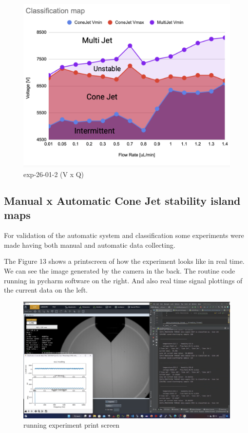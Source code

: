     \begin{figure}[H]
        \center
        \includegraphics[width=12cm]{Figuras/regions.png}
        \caption{ exp-26-01-2 (V x Q)}
    \end{figure}



    \subsection{Manual x Automatic Cone Jet stability island maps}

        For validation of the automatic system and classification some experiments were made having both manual and automatic data collecting.

        The Figure 13 shows a printscreen of how the experiment looks like in real time.
        We can see the image generated by the camera in the back.
        The routine code running in pycharm software on the right.
        And also real time signal plottings of the current data on the left.

        \begin{figure}[H]
            \center
            \includegraphics[width=17cm]{Figuras/19:03/axs1.png}
            \caption{running experiment print screen}
        \end{figure}

